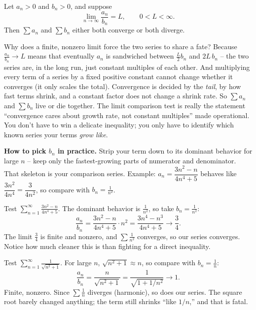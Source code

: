 \begin{theorem}
\label{ch29:thm-limcomparison}
Let $a_n > 0$ and $b_n > 0$, and suppose
\[
\lim_{n\to\infty} \frac{a_n}{b_n} = L, \qquad 0 < L < \infty.
\]
Then $\sum a_n$ and $\sum b_n$ either both converge or both diverge.
\end{theorem}

\begin{whybox}
Why does a finite, nonzero limit force the two series to share a fate? Because $\tfrac{a_n}{b_n}\to L$ means that eventually $a_n$ is sandwiched between $\tfrac{L}{2}b_n$ and $2L\,b_n$ -- the two series are, in the long run, just constant multiples of each other. And multiplying every term of a series by a fixed positive constant cannot change whether it converges (it only scales the total). Convergence is decided by the \emph{tail}, by how fast terms shrink, and a constant factor does not change a shrink rate. So $\sum a_n$ and $\sum b_n$ live or die together. The limit comparison test is really the statement ``convergence cares about growth rate, not constant multiples'' made operational. You don't have to win a delicate inequality; you only have to identify which known series your terms \emph{grow like}.
\end{whybox}

\begin{focusbox}
\textbf{How to pick $b_n$ in practice.} Strip your term down to its dominant behavior for large $n$ -- keep only the fastest-growing parts of numerator and denominator. That skeleton is your comparison series. Example: $a_n = \dfrac{3n^2 - n}{4n^4 + 5}$ behaves like $\dfrac{3n^2}{4n^4} = \dfrac{3}{4n^2}$, so compare with $b_n = \tfrac{1}{n^2}$.
\end{focusbox}

\begin{example}
Test $\displaystyle\sum_{n=1}^\infty \frac{3n^2 - n}{4n^4 + 5}$. The dominant behavior is $\tfrac{1}{n^2}$, so take $b_n = \tfrac1{n^2}$:
\[
\frac{a_n}{b_n} = \frac{3n^2 - n}{4n^4 + 5}\cdot n^2 = \frac{3n^4 - n^3}{4n^4 + 5} \longrightarrow \frac{3}{4}.
\]
The limit $\tfrac34$ is finite and nonzero, and $\sum\tfrac1{n^2}$ converges, so our series converges. Notice how much cleaner this is than fighting for a direct inequality.
\end{example}

\begin{example}
Test $\displaystyle\sum_{n=1}^\infty \frac{1}{\sqrt{n^2+1}}$. For large $n$, $\sqrt{n^2+1}\approx n$, so compare with $b_n=\tfrac1n$:
\[
\frac{a_n}{b_n} = \frac{n}{\sqrt{n^2+1}} = \frac{1}{\sqrt{1+1/n^2}} \longrightarrow 1.
\]
Finite, nonzero. Since $\sum\tfrac1n$ diverges (harmonic), so does our series. The square root barely changed anything; the term still shrinks ``like $1/n$,'' and that is fatal.
\end{example}

